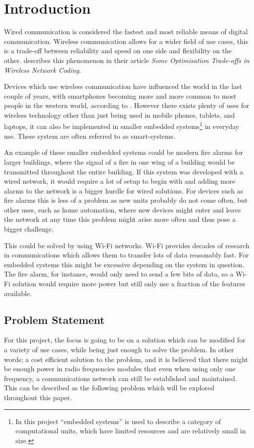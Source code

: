 \chapter{Introduction}
\vspace{-20pt}
Wired communication is considered the fastest and most reliable means of digital communication.
Wireless communication allows for a wider field of use cases, this is a trade-off between reliability and speed on one side and flexibility on the other. 
\citet{wirelessTradeoffs} describes this phenomenon in their article \emph{Some Optimisation Trade-offs in Wireless Network Coding}.

Devices which use wireless communication have influenced the world in the last couple of years, with smartphones becoming more and more common to most people in the western world, according to \citet{2013-SmartPhoneUse}.
However there exists plenty of uses for wireless technology other than just being used in mobile phones, tablets, and laptops, it can also be implemented in smaller embedded systems\footnote{In this project \enquote{embedded systems} is used to describe a category of computational units, which have limited resources and are relatively small in size. } in everyday use.
These system are often referred to as smart-systems.

An example of these smaller embedded systems could be modern fire alarms for larger buildings, where the signal of a fire in one wing of a building would be transmitted throughout the entire building.
If this system was developed with a wired network, it would require a lot of setup to begin with 
and adding more alarms to the network is a bigger hurdle for wired solutions. 
For devices such as fire alarms this is less of a problem as new units probably do not come often, but other uses, such as home automation, where new devices might enter and leave the network at any time this problem might arise more often and thus pose a bigger challenge.

This could be solved by using Wi-Fi networks.
Wi-Fi provides decades of research in communications which allows them to transfer lots of data reasonably fast.
For embedded systems this might be excessive depending on the system in question.
The fire alarm, for instance, would only need to send a few bits of data, so a Wi-Fi solution would require more power but still only use a fraction of the features available.

\newpage
\section{Problem Statement}\label{sec:problemStatement}
For this project, the focus is going to be on a solution which can be modified for a variety of use cases, while being just enough to solve the problem.
In other words; a cost efficient solution to the problem, and it is believed that there might be enough power in radio frequencies modules that even when using only one frequency, a communications network can still be established and maintained.
This can be described as the following problem which will be explored throughout this paper.


